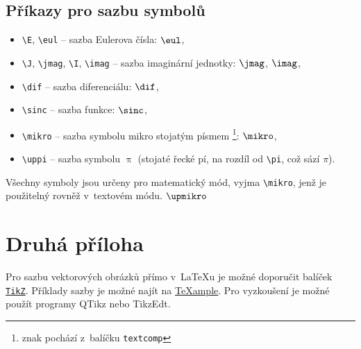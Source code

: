 \newpage
\section{Příkazy pro sazbu symbolů}

\begin{itemize}
  \item
    \verb|\E|, \verb|\eul| -- sazba Eulerova čísla: $\eul$,
  \item
    \verb|\J|, \verb|\jmag|, \verb|\I|, \verb|\imag| -- sazba imaginární jednotky: $\jmag$, $\imag$,
  \item
    \verb|\dif| -- sazba diferenciálu: $\dif$,
  \item
    \verb|\sinc| -- sazba funkce: $\sinc$,
  \item
    \verb|\mikro| -- sazba symbolu mikro stojatým písmem%
			\footnote{znak pochází z~balíčku \texttt{textcomp}}: $\mikro$,
	\item
		\verb|\uppi| -- sazba symbolu $\uppi$
			(stojaté řecké pí, na rozdíl od \verb|\pi|, což sází $\pi$).
\end{itemize}

Všechny symboly jsou určeny pro matematický mód, vyjma \verb|\mikro|, jenž je\\ použitelný rovněž v~textovém módu.
$\upmikro$


\chapter{Druhá příloha}

Pro sazbu vektorových obrázků přímo v~\LaTeX{}u je možné doporučit balíček \href{https://www.ctan.org/pkg/pgf}{\texttt{TikZ}}.
Příklady sazby je možné najít na \href{http://www.texample.net/tikz/examples/}{\TeX{}ample}.
Pro vyzkoušení je možné použít programy QTikz nebo TikzEdt.






